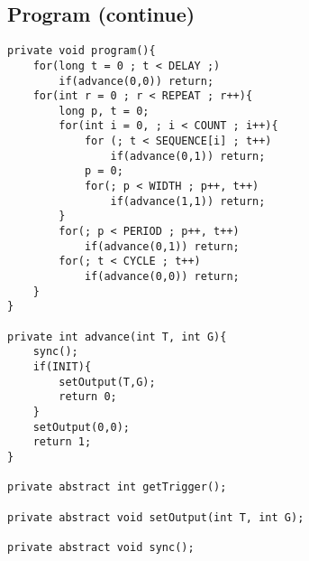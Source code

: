 \documentclass{article}
\begin{document}
\subsection*{Program (continue)}
\begin{lstlisting}
private void program(){
	for(long t = 0 ; t < DELAY ;)
		if(advance(0,0)) return;
	for(int r = 0 ; r < REPEAT ; r++){
		long p, t = 0;
		for(int i = 0, ; i < COUNT ; i++){
			for (; t < SEQUENCE[i] ; t++)
				if(advance(0,1)) return;
			p = 0;
			for(; p < WIDTH ; p++, t++)
				if(advance(1,1)) return;
		}
		for(; p < PERIOD ; p++, t++)
			if(advance(0,1)) return;
		for(; t < CYCLE ; t++)
			if(advance(0,0)) return;
	}
}

private int advance(int T, int G){
	sync();
	if(INIT){
		setOutput(T,G);
		return 0;
	}
	setOutput(0,0);
	return 1;
}

private abstract int getTrigger();

private abstract void setOutput(int T, int G);

private abstract void sync();
\end{lstlisting}
\clearpage\thispagestyle{empty}
\end{document}
